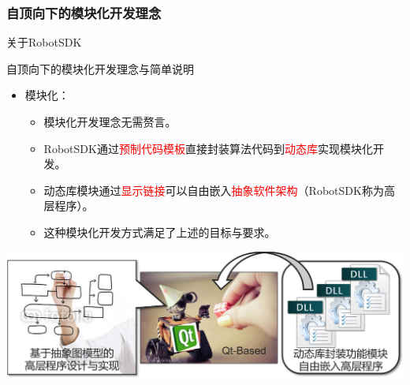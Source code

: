 \documentclass[9pt]{beamer}
\begin{document}
	\subsubsection{自顶向下的模块化开发理念}
	\begin{frame}{关于RobotSDK}
		\begin{block}{自顶向下的模块化开发理念与简单说明}
			\begin{itemize}
				\item 模块化：
				\begin{itemize}
					\item 模块化开发理念无需赘言。
					\item RobotSDK通过\textcolor{red}{预制代码模板}直接封装算法代码到\textcolor{red}{动态库}实现模块化开发。
					\item 动态库模块通过\textcolor{red}{显示链接}可以自由嵌入\textcolor{red}{抽象软件架构}（RobotSDK称为高层程序）。
					\item 这种模块化开发方式满足了上述的目标与要求。
				\end{itemize}
			\end{itemize}
		\end{block}
		\begin{center}
			\includegraphics[width=\textwidth]{./img/idea}
		\end{center}
	\end{frame}
\end{document}
